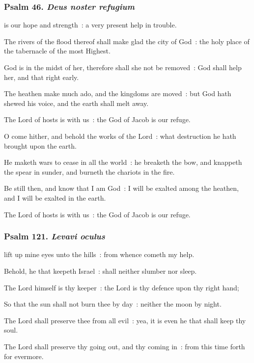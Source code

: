 \subsubsection{Psalm 46. \textit{Deus noster refugium}}
 is our hope and strength~: a very present help in trouble.\par
{}
The rivers of the flood thereof shall make glad the city of God~: the holy place of the tabernacle of the most Highest.\par
{}God is in the midst of her, therefore shall she not be removed~: God shall help her, and that right early.\par
{}The heathen make much ado, and the kingdoms are moved~: but God hath shewed his voice, and the earth shall melt away.\par
{}The Lord of hosts is with us~: the God of Jacob is our refuge.\par
{}O come hither, and behold the works of the Lord~: what destruction he hath brought upon the earth.\par
{}He maketh wars to cease in all the world~: he breaketh the bow, and knappeth the spear in sunder, and burneth the chariots in the fire.\par
{}Be still then, and know that I am God~: I will be exalted among the heathen, and I will be exalted in the earth.\par
{}The Lord of hosts is with us~: the God of Jacob is our refuge.\par

\clearpage
\subsubsection{Psalm 121. \textit{Levavi oculus}}
 lift up mine eyes unto the hills~: from whence cometh my help.\par
{}
Behold, he that keepeth Israel~: shall neither slumber nor sleep.\par
{}The Lord himself is thy keeper~: the Lord is thy defence upon thy right hand;\par
{}So that the sun shall not burn thee by day~: neither the moon by night.\par
{}The Lord shall preserve thee from all evil~: yea, it is even he that shall keep thy soul.\par
{}The Lord shall preserve thy going out, and thy coming in~: from this time forth for evermore.\par

